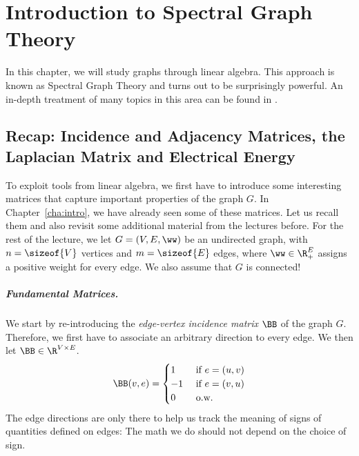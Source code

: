 
\chapter{Introduction to Spectral Graph Theory}



%
\sloppy

In this chapter, we will study graphs through linear algebra. This
approach is known as Spectral Graph Theory and turns out to be
surprisingly powerful.
An in-depth treatment of many topics in this area can be found in \cite{S19}.

\section{Recap: Incidence and Adjacency Matrices, the Laplacian
  Matrix and Electrical Energy}

To exploit tools from linear algebra, we first have to introduce some interesting matrices that capture important properties of the graph $G$. 
In Chapter~\ref{cha:intro}, we have already seen some of these matrices. Let us recall them and also revisit some additional material from the lectures before. For the rest of the lecture, we let $G=(V, E, \ww)$ be an undirected graph, with
$n=\sizeof{V}$ vertices and $m = \sizeof{E}$ edges, where $\ww \in
\R_+^E$ assigns a positive weight for every edge.
We also assume that $G$ is connected!

\paragraph{Fundamental Matrices.} 

We start by re-introducing the \emph{edge-vertex incidence matrix} $\BB$ of the graph $G$. Therefore,
we first have to associate an arbitrary direction to every edge. We then let
$\BB \in \R^{V \times E}$.
\[
  \BB(v,e) =
  \begin{cases}
    1 & \text{ if } e = (u,v) \\
    -1 &\text{ if } e = (v,u) \\
    0 &\text{ o.w.}
  \end{cases}
\]
The edge directions are only there to help us track the meaning of signs of
quantities defined on edges: The math we do should not depend on the
choice of sign.

